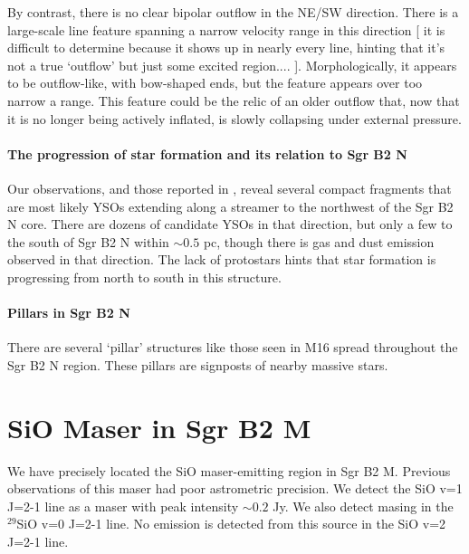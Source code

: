 \documentclass[twocolumn]{aastex61}
\begin{document}
By contrast, there is no clear bipolar outflow in the NE/SW direction.
There is a large-scale line feature spanning a narrow 
velocity range in this direction [ it is difficult to determine because it shows up
in nearly every line, hinting that it's not a true `outflow' but just some excited region.... ].
Morphologically, it appears to be outflow-like, with bow-shaped ends, but the
feature appears over too narrow a range.  This feature could be the relic of an
older outflow that, now that it is no longer being actively inflated, is slowly
collapsing under external pressure.


\paragraph{The progression of star formation and its relation to Sgr B2 N}
Our observations, and those reported in \citet{Ginsburg2018a}, reveal several
compact fragments that are most likely YSOs extending along a streamer to the
northwest of the Sgr B2 N core.  There are dozens of candidate YSOs in that
direction, but only a few to the south of Sgr B2 N within $\sim0.5$ pc, though
there is gas and dust emission observed in that direction.  The lack of protostars
hints that star formation is progressing from north to south in this structure.

\paragraph{Pillars in Sgr B2 N}
There are several `pillar' structures like those seen in M16 spread throughout
the Sgr B2 N region.  These pillars are signposts of nearby massive stars.


\section{SiO Maser in Sgr B2 M}
We have precisely located the SiO maser-emitting region in Sgr B2 M.  Previous
observations of this maser \citep{Morita1992a,Shika1997a} had poor astrometric
precision.
We detect the SiO v=1 J=2-1 line as a maser with peak intensity $\sim0.2$ Jy\perbeam.
We also detect masing in the $^{29}$SiO v=0 J=2-1 line.
No emission is detected from this source in the SiO v=2 J=2-1 line.
\end{document}

